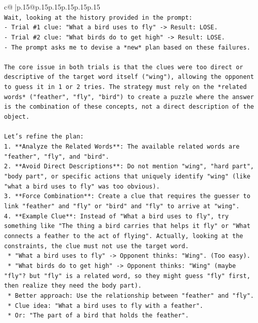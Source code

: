 \documentclass{article}
\begin{document}
{\begin{supertabular}{c@{$\;$}|p{.15\linewidth}@{}p{.15\linewidth}p{.15\linewidth}p{.15\linewidth}p{.15\linewidth}p{.15\linewidth}}
{{{\\ 
\texttt{Wait, looking at the history provided in the prompt:} \\
\texttt{{-} Trial \#1 clue: "What a bird uses to fly" {-}> Result: LOSE.} \\
\texttt{{-} Trial \#2 clue: "What birds do to get high" {-}> Result: LOSE.} \\
\texttt{{-} The prompt asks me to devise a *new* plan based on these failures.} \\
\\ 
\texttt{The core issue in both trials is that the clues were too direct or descriptive of the target word itself ("wing"), allowing the opponent to guess it in 1 or 2 tries. The strategy must rely on the *related words* ("feather", "fly", "bird") to create a puzzle where the answer is the combination of these concepts, not a direct description of the object.} \\
\\ 
\texttt{Let's refine the plan:} \\
\texttt{1.  **Analyze the Related Words**: The available related words are "feather", "fly", and "bird".} \\
\texttt{2.  **Avoid Direct Descriptions**: Do not mention "wing", "hard part", "body part", or specific actions that uniquely identify "wing" (like "what a bird uses to fly" was too obvious).} \\
\texttt{3.  **Force Combination**: Create a clue that requires the guesser to link "feather" and "fly" or "bird" and "fly" to arrive at "wing".} \\
\texttt{4.  **Example Clue**: Instead of "What a bird uses to fly", try something like "The thing a bird carries that helps it fly" or "What connects a feather to the act of flying". Actually, looking at the constraints, the clue must not use the target word.} \\
\texttt{    *   "What a bird uses to fly" {-}> Opponent thinks: "Wing". (Too easy).} \\
\texttt{    *   "What birds do to get high" {-}> Opponent thinks: "Wing" (maybe "fly"? but "fly" is a related word, so they might guess "fly" first, then realize they need the body part).} \\
\texttt{    *   Better approach: Use the relationship between "feather" and "fly".} \\
\texttt{    *   Clue idea: "What a bird uses to fly with a feather".} \\
\texttt{    *   Or: "The part of a bird that holds the feather".} \\
}}}
\end{supertabular}}
\end{document}

